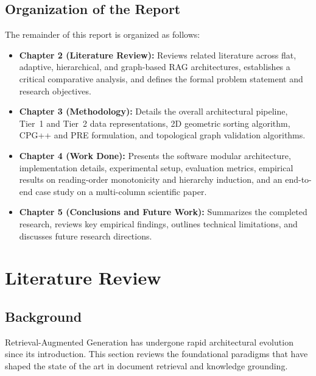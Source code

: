\documentclass[12pt,a4paper]{report}
\begin{document}
\section{Organization of the Report}
The remainder of this report is organized as follows:
\begin{itemize}
    \item \textbf{Chapter 2 (Literature Review):} Reviews related literature across flat, adaptive, hierarchical, and graph-based RAG architectures, establishes a critical comparative analysis, and defines the formal problem statement and research objectives.
    \item \textbf{Chapter 3 (Methodology):} Details the overall architectural pipeline, Tier~1 and Tier~2 data representations, 2D geometric sorting algorithm, CPG++ and PRE formulation, and topological graph validation algorithms.
    \item \textbf{Chapter 4 (Work Done):} Presents the software modular architecture, implementation details, experimental setup, evaluation metrics, empirical results on reading-order monotonicity and hierarchy induction, and an end-to-end case study on a multi-column scientific paper.
    \item \textbf{Chapter 5 (Conclusions and Future Work):} Summarizes the completed research, reviews key empirical findings, outlines technical limitations, and discusses future research directions.
\end{itemize}

\chapter{Literature Review}

\section{Background}
Retrieval-Augmented Generation has undergone rapid architectural evolution since its introduction. This section reviews the foundational paradigms that have shaped the state of the art in document retrieval and knowledge grounding.
\end{document}

